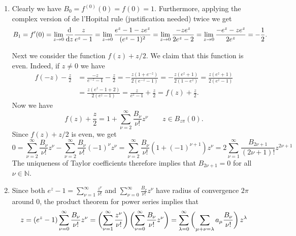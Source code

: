 \begin{enumerate}[label = \textbf{Exercise \arabic*.},wide = 0pt, itemsep=1.5ex]
		\begin{enumerate}[label = (\roman*),wide = 0pt, itemsep=1.5ex]
			\item Clearly we have $B_0 = f^{(0)}(0) = f(0) = 1$. Furthermore, applying the complex version of de l'Hopital rule (justification needed) twice we get
				\begin{equation*}
					B_1 = f'(0) = \lim_{z \to 0} \frac{\mathop{}\!\mathrm{d}}{\mathop{}\!\mathrm{d} z}\frac{z}{e^z - 1} = \lim_{z \to 0} \frac{e^z - 1 - ze^z}{(e^z - 1)^2} = \lim_{z \to 0} \frac{-ze^z}{2e^z - 2} = \lim_{z \to 0} \frac{-e^z - ze^z}{2e^z} = - \frac{1}{2}.
				\end{equation*}

				Next we consider the function $f(z) + z/2$. We claim that this function is even. Indeed, if $z \neq 0$ we have 
				\begin{align*}
					f(-z) - \frac{z}{2} &= \frac{-z}{e^{-z} - 1} - \frac{z}{2} = -\frac{z(1 + e^{-z})}{2(e^{-z} - 1)} = -\frac{z(e^z + 1)}{2(1 - e^z)}= \frac{z(e^z + 1)}{2(e^z - 1)}\\
					&= \frac{z(e^z - 1 + 2)}{2(e^z - 1)}= \frac{z}{e^z - 1} + \frac{z}{2}= f(z) + \frac{z}{2}.
				\end{align*}
			Now we have 
			\begin{equation}
				f(z) + \frac{z}{2} = 1 + \sum_{\nu = 2}^\infty \frac{B_\nu}{\nu !} z^\nu \qquad z \in B_{z\pi}(0).
			\end{equation}
			Since $f(z) + z/2$ is even, we get
			\begin{equation}
				0 = \sum_{\nu = 2}^\infty \frac{B_\nu}{\nu !} z^\nu - \sum_{\nu = 2}^\infty \frac{B_\nu}{\nu !} (-1)^\nu z^\nu = \sum_{\nu = 2}^\infty \frac{B_\nu}{\nu !} (1 + (-1)^{\nu+1})z^\nu = 2\sum_{\nu = 1}^\infty \frac{B_{2\nu + 1}}{(2\nu + 1)!}z^{2\nu + 1}
			\end{equation}
			The uniqueness of Taylor coefficients therefore implies that $B_{2\nu + 1} = 0$ for all $\nu \in \mathbb{N}$.
		\item Since both $e^z - 1 = \sum_{\nu = 1}^\infty\frac{z^\nu}{\nu!}$ and $\sum_{\nu = 0}^\infty\frac{B_\nu}{\nu!}z^\nu$ have radius of convergence $2\pi$ around $0$, the product theorem for power series \cite[195]{remmert2002funktionentheorie} implies that 
			\begin{equation}
				z = (e^z - 1)\sum_{\nu = 0}^\infty \frac{B_\nu}{\nu !}z^\nu= \del[3]{\sum_{\nu = 1}^\infty \frac{z^\nu}{\nu!}} \del[3]{\sum_{\nu = 0}^\infty \frac{B_\nu}{\nu!}z^\nu}= \sum_{\lambda = 0}^\infty \del[3]{\sum_{\mu + \nu = \lambda}a_\mu \frac{B_\nu}{\nu !}}z^\lambda
			\end{equation}


\end{enumerate}
\end{enumerate}
